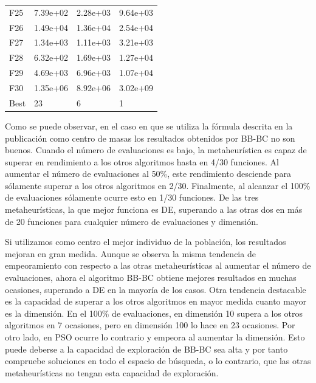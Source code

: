 \begin{table}[H]
\begin{minipage}{.5\linewidth}
\begin{tabular}{llll}
        F25  &  7.39e+02 &   2.28e+03 &  9.64e+03 \\
        F26  &  1.49e+04 &   1.36e+04 &  2.54e+04 \\
        F27  &  1.34e+03 &   1.11e+03 &  3.21e+03 \\
        F28  &  6.32e+02 &   1.69e+03 &  1.27e+04 \\
        F29  &  4.69e+03 &   6.96e+03 &  1.07e+04 \\
        F30  &  1.35e+06 &   8.92e+06 &  3.02e+09 \\
        Best &        23 &          6 &         1 \\
        \bottomrule
        \end{tabular}
        
    \end{minipage} 
\end{table}

\newpage
Como se puede observar, en el caso en que se utiliza la fórmula descrita en la publicación como centro de masas los resultados obtenidos por BB-BC no son buenos. Cuando el número de evaluaciones es bajo, la metaheurística es capaz de superar en rendimiento a los otros algoritmos hasta en 4/30 funciones. Al aumentar el número de evaluaciones al 50\%, este rendimiento desciende para sólamente superar a los otros algoritmos en 2/30. Finalmente, al alcanzar el 100\% de evaluaciones sólamente ocurre esto en 1/30 funciones. De las tres metaheurísticas, la que mejor funciona es DE, superando a las otras dos en más de 20 funciones para cualquier número de evaluaciones y dimensión. 

Si utilizamos como centro el mejor individuo de la población, los resultados mejoran en gran medida. Aunque se observa la misma tendencia de empeoramiento con respecto a las otras metaheurísticas al aumentar el número de evaluaciones, ahora el algoritmo BB-BC obtiene mejores resultados en muchas ocasiones, superando a DE en la mayoría de los casos. Otra tendencia destacable es la capacidad de superar a los otros algoritmos en mayor medida cuanto mayor es la dimensión. En el 100\% de evaluaciones, en dimensión 10 supera a los otros algoritmos en 7 ocasiones, pero en dimensión 100 lo hace en 23 ocasiones. Por otro lado, en PSO ocurre lo contrario y empeora al aumentar la dimensión. Esto puede deberse a la capacidad de exploración de BB-BC sea alta y por tanto compruebe soluciones en todo el espacio de búsqueda, o lo contrario, que las otras metaheurísticas no tengan esta capacidad de exploración.

